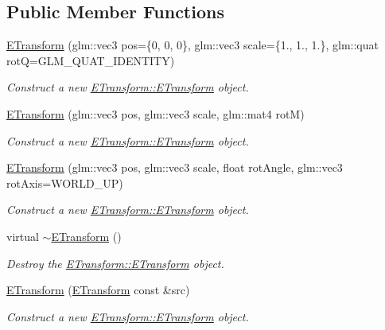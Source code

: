 \subsection*{Public Member Functions}
\begin{DoxyCompactItemize}
\item 
\hyperlink{class_e_transform_a02d0c5c497192db1a52b56354a9c595a}{E\+Transform} (glm\+::vec3 pos=\{0, 0, 0\}, glm\+::vec3 scale=\{1., 1., 1.\}, glm\+::quat rotQ=G\+L\+M\+\_\+\+Q\+U\+A\+T\+\_\+\+I\+D\+E\+N\+T\+I\+TY)
\begin{DoxyCompactList}\small\item\em Construct a new \hyperlink{class_e_transform_a02d0c5c497192db1a52b56354a9c595a}{E\+Transform\+::\+E\+Transform} object. \end{DoxyCompactList}\item 
\hyperlink{class_e_transform_aba3cf913236b823997b0eed3b937af56}{E\+Transform} (glm\+::vec3 pos, glm\+::vec3 scale, glm\+::mat4 rotM)
\begin{DoxyCompactList}\small\item\em Construct a new \hyperlink{class_e_transform_a02d0c5c497192db1a52b56354a9c595a}{E\+Transform\+::\+E\+Transform} object. \end{DoxyCompactList}\item 
\hyperlink{class_e_transform_a83753acfc108765d57368b69704456bd}{E\+Transform} (glm\+::vec3 pos, glm\+::vec3 scale, float rot\+Angle, glm\+::vec3 rot\+Axis=W\+O\+R\+L\+D\+\_\+\+UP)
\begin{DoxyCompactList}\small\item\em Construct a new \hyperlink{class_e_transform_a02d0c5c497192db1a52b56354a9c595a}{E\+Transform\+::\+E\+Transform} object. \end{DoxyCompactList}\item 
\mbox{\label{class_e_transform_ad54b9a1f1cd15d5f0ba448844bbe55f8}} 
virtual \hyperlink{class_e_transform_ad54b9a1f1cd15d5f0ba448844bbe55f8}{$\sim$\+E\+Transform} ()
\begin{DoxyCompactList}\small\item\em Destroy the \hyperlink{class_e_transform_a02d0c5c497192db1a52b56354a9c595a}{E\+Transform\+::\+E\+Transform} object. \end{DoxyCompactList}\item 
\hyperlink{class_e_transform_a0649c6ebacc069a97bc399819666ab9c}{E\+Transform} (\hyperlink{class_e_transform}{E\+Transform} const \&src)
\begin{DoxyCompactList}\small\item\em Construct a new \hyperlink{class_e_transform_a02d0c5c497192db1a52b56354a9c595a}{E\+Transform\+::\+E\+Transform} object. \end{DoxyCompactList}\item 

\end{DoxyCompactItemize}

